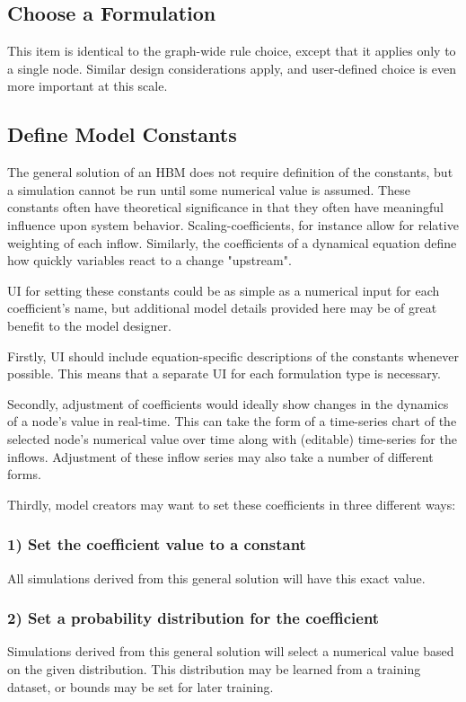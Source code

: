 \subsection{Choose a Formulation}
This item is identical to the graph-wide rule choice, except that it applies only to a single node. Similar design considerations apply, and user-defined choice is even more important at this scale.

\subsection{Define Model Constants}
The general solution of an HBM does not require definition of the constants, but a simulation cannot be run until some numerical value is assumed. 
These constants often have theoretical significance in that they often have meaningful influence upon system behavior. 
Scaling-coefficients, for instance allow for relative weighting of each inflow. 
Similarly, the coefficients of a dynamical equation define how quickly variables react to a change "upstream". 

UI for setting these constants could be as simple as a numerical input for each coefficient's name, but additional model details provided here may be of great benefit to the model designer. 

Firstly, UI should include equation-specific descriptions of the constants whenever possible. This means that a separate UI for each formulation type is necessary. 

Secondly, adjustment of coefficients would ideally show changes in the dynamics of a node's value in real-time. 
This can take the form of a time-series chart of the selected node's numerical value over time along with (editable) time-series for the inflows. 
Adjustment of these inflow series may also take a number of different forms. 

Thirdly, model creators may want to set these coefficients in three different ways: 
\subsubsection{1) Set the coefficient value to a constant}
All simulations derived from this general solution will have this exact value.

\subsubsection{2) Set a probability distribution for the coefficient}
Simulations derived from this general solution will select a numerical value based on the given distribution. 
This distribution may be learned from a training dataset, or bounds may be set for later training. 

